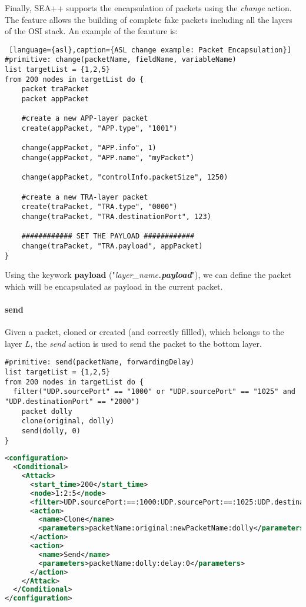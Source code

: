 Finally, SEA++ supports the encapsulation of packets using the \emph{change} action. The feature allows the building of complete fake packets including all the layers of the OSI stack. An example of the feauture is:
%
\begin{lstlisting} [language={asl},caption={ASL change example: Packet Encapsulation}]
#primitive: change(packetName, fieldName, variableName)
list targetList = {1,2,5}
from 200 nodes in targetList do {
    packet traPacket
    packet appPacket

    #create a new APP-layer packet
    create(appPacket, "APP.type", "1001")
    
    change(appPacket, "APP.info", 1)
    change(appPacket, "APP.name", "myPacket")
    
    change(appPacket, "controlInfo.packetSize", 1250)

    #create a new TRA-layer packet
    create(traPacket, "TRA.type", "0000") 
    change(traPacket, "TRA.destinationPort", 123)
    
    ############ SET THE PAYLOAD ############
    change(traPacket, "TRA.payload", appPacket) 
}
\end{lstlisting}

Using the keywork \textbf{payload} ("\emph{layer\_name\textbf{.payload}}"), we can define the packet which will be encapsulated as payload in the current packet.

\paragraph{send}
Given a packet, cloned or created (and correctly fillled), which belongs to the layer $L$, the \emph{send} action is used to send the packet to the bottom layer.
%
\begin{lstlisting}[language={asl},caption={ASL send example}]
#primitive: send(packetName, forwardingDelay)
list targetList = {1,2,5}
from 200 nodes in targetList do {
  filter("UDP.sourcePort" == "1000" or "UDP.sourcePort" == "1025" and "UDP.destinationPort" == "2000")
    packet dolly
    clone(original, dolly)
    send(dolly, 0)
}
\end{lstlisting}
%
\begin{lstlisting}[language={xml},caption={Interpreter output}]
<configuration>
  <Conditional>
    <Attack>
      <start_time>200</start_time>
      <node>1:2:5</node>
      <filter>UDP.sourcePort:==:1000:UDP.sourcePort:==:1025:UDP.destinationPort:==:2000:AND:OR</filter>
      <action>
        <name>Clone</name>          
        <parameters>packetName:original:newPacketName:dolly</parameters>                        
      </action>
      <action>
        <name>Send</name>
        <parameters>packetName:dolly:delay:0</parameters>
      </action>
    </Attack>
  </Conditional>
</configuration>
\end{lstlisting}


